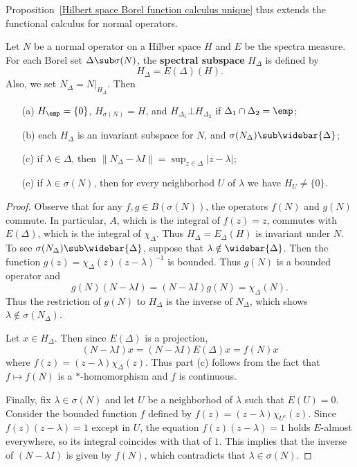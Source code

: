 Proposition~\ref{Hilbert space Borel function calculus unique} thus extends the functional calculus for normal operators.
\begin{proposition}\label{Hilbert space spectral subspace prop}
Let $N$ be a normal operator on a Hilber space $H$ and $E$ be the spectra measure. For each Borel set $\Delta\sub\sigma(N)$, the \textbf{spectral subspace} $H_\Delta$ is defined by
\[H_\Delta=E(\Delta)(H).\]
Also, we set $N_\Delta=N|_{H_\Delta}$. Then
\begin{itemize}
\item[(a)] $H_\emp=\{0\}$, $H_{\sigma(N)}=H$, and $H_{\Delta_1}\bot H_{\Delta_2}$ if $\Delta_1\cap\Delta_2=\emp$;
\item[(b)] each $H_\Delta$ is an invariant subspace for $N$, and $\sigma(N_{\Delta})\sub\widebar{\Delta}$;
\item[(c)] if $\lambda\in\Delta$, then $\|N_\Delta-\lambda I\|=\sup_{z\in\Delta}|z-\lambda|$;
\item[(e)] if $\lambda\in\sigma(N)$, then for every neighborhod $U$ of $\lambda$ we have $H_U\neq\{0\}$.
\end{itemize}
\end{proposition}
\begin{proof}
Observe that for any $f,g\in B(\sigma(N))$, the operators $f(N)$ and $g(N)$ commute. In particular, $A$, which is the integral of $f(z)=z$, commutes with $E(\Delta)$, which is the integral of $\chi_\Delta$. Thus $H_\Delta=E_\Delta(H)$ is invariant under $N$. To see $\sigma(N_\Delta)\sub\widebar{\Delta}$, suppose that $\lambda\notin\widebar{\Delta}$. Then the function $g(z)=\chi_\Delta(z)(z-\lambda)^{-1}$ is bounded. Thus $g(N)$ is a bounded operator and
\[g(N)(N-\lambda I)=(N-\lambda I)g(N)=\chi_\Delta(N).\]
Thus the restriction of $g(N)$ to $H_\Delta$ is the inverse of $N_\Delta$, which shows $\lambda\notin\sigma(N_\Delta)$.\par
Let $x\in H_\Delta$. Then since $E(\Delta)$ is a projection,
\[(N-\lambda I)x=(N-\lambda I)E(\Delta)x=f(N)x\]
where $f(z)=(z-\lambda)\chi_\Delta(z)$. Thus part (c) follows from the fact that $f\mapsto f(N)$ is a $*$-homomorphism and $f$ is continuous.\par
Finally, fix $\lambda\in\sigma(N)$ and let $U$ be a neighborhod of $\lambda$ such that $E(U)=0$. Consider the bounded function $f$ defined by $f(z)=(z-\lambda)\chi_{U^c}(z)$. Since $f(z)(z-\lambda)=1$ except in $U$, the equation $f(z)(z-\lambda)=1$ holds $E$-almost everywhere, so its integral coincides with that of $1$. This implies that the inverse of $(N-\lambda I)$ is given by $f(N)$, which contradicts that $\lambda\in\sigma(N)$.
\end{proof}
